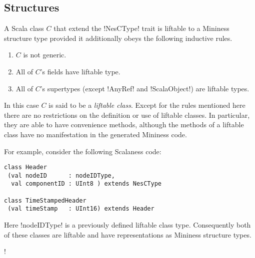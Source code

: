 \subsection{Structures}
\label{section-structures-design}

A Scala class $C$ that extend the !NesCType! trait is liftable to a Mininess structure type
provided it additionally obeys the following inductive rules.

\begin{enumerate}
\item $C$ is not generic.
\item All of $C$'s fields have liftable type.
\item All of $C$'s supertypes (except !AnyRef! and !ScalaObject!) are liftable types.
\end{enumerate}

In this case $C$ is said to be a \textit{liftable class}. Except for the rules mentioned here
there are no restrictions on the definition or use of liftable classes. In particular, they are
able to have convenience methods, although the methods of a liftable class have no manifestation
in the generated Mininess code.

For example, consider the following Scalaness code:

\singlespace
\begin{lstlisting}[language=scalaness]
class Header
 (val nodeID      : nodeIDType,
  val componentID : UInt8 ) extends NesCType

class TimeStampedHeader
 (val timeStamp   : UInt16) extends Header
\end{lstlisting}
\primaryspacing

Here !nodeIDType! is a previously defined liftable class type. Consequently both of these
classes are liftable and have representations as Mininess structure types. 

\lstDeleteShortInline!

